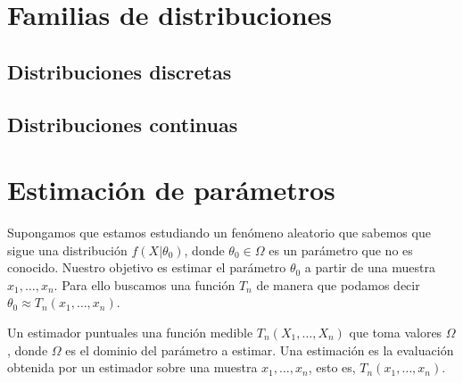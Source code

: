 \documentclass{article}
\begin{document}
\maketitle



\newpage
\tableofcontents
\newpage


\section{Familias de distribuciones}

\subsection{Distribuciones discretas}

\subsection{Distribuciones continuas}

\section{Estimación de parámetros}

Supongamos que estamos estudiando un fenómeno aleatorio que sabemos que sigue una distribución $f(X | \theta_0)$, donde $\theta_0 \in \Omega$ es un parámetro que no es conocido. Nuestro objetivo es estimar el parámetro $\theta_0$ a partir de una muestra $x_1, \ldots, x_n$. Para ello buscamos una función $T_n$ de manera que podamos decir $\theta_0 \approx T_n(x_1, \ldots, x_n)$.

\begin{definition}
    Un estimador puntuales una función medible $T_n(X_1, \ldots, X_n)$ que toma valores $\Omega$, donde $\Omega$ es el dominio del parámetro a estimar. Una estimación es la evaluación obtenida por un estimador sobre una muestra $x_1, \ldots, x_n$, esto es, $T_n(x_1, \ldots, x_n)$.
\end{definition}
\end{document}
